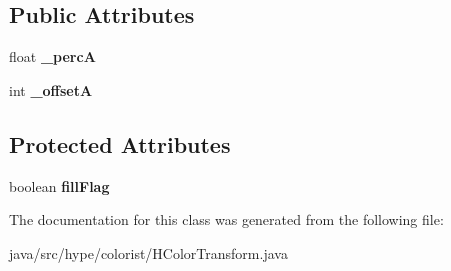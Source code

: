\subsection*{Public Attributes}
\begin{DoxyCompactItemize}
\item 
\hypertarget{classhype_1_1colorist_1_1_h_color_transform_aff98c3552490d02a099258f393a99781}{float {\bfseries \-\_\-perc\-A}}\label{classhype_1_1colorist_1_1_h_color_transform_aff98c3552490d02a099258f393a99781}

\item 
\hypertarget{classhype_1_1colorist_1_1_h_color_transform_aee4e808255a2c3e3d10980da4c2cc71e}{int {\bfseries \-\_\-offset\-A}}\label{classhype_1_1colorist_1_1_h_color_transform_aee4e808255a2c3e3d10980da4c2cc71e}

\end{DoxyCompactItemize}
\subsection*{Protected Attributes}
\begin{DoxyCompactItemize}
\item 
\hypertarget{classhype_1_1colorist_1_1_h_color_transform_ae87ee3a68c382df64151c56f8eeca2d4}{boolean {\bfseries fill\-Flag}}\label{classhype_1_1colorist_1_1_h_color_transform_ae87ee3a68c382df64151c56f8eeca2d4}

\end{DoxyCompactItemize}


The documentation for this class was generated from the following file\-:\begin{DoxyCompactItemize}
\item 
java/src/hype/colorist/H\-Color\-Transform.\-java\end{DoxyCompactItemize}
